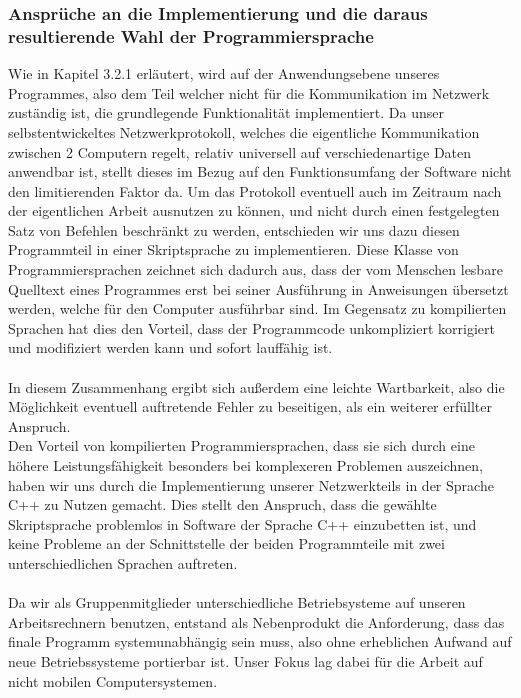 \subsubsection{Ansprüche an die Implementierung und die daraus resultierende Wahl der Programmiersprache}
Wie in Kapitel 3.2.1 %
 erläutert, wird auf der Anwendungsebene unseres Programmes, also dem Teil welcher nicht für die Kommunikation im Netzwerk zuständig ist, die grundlegende Funktionalität implementiert. Da unser selbstentwickeltes Netzwerkprotokoll, welches die eigentliche Kommunikation zwischen 2 Computern regelt, relativ universell auf verschiedenartige Daten anwendbar ist, stellt dieses im Bezug auf den Funktionsumfang der Software nicht den limitierenden Faktor da. Um das Protokoll eventuell auch im Zeitraum nach der eigentlichen Arbeit ausnutzen zu können, und nicht durch einen festgelegten Satz von Befehlen beschränkt zu werden, entschieden wir uns dazu diesen Programmteil in einer Skriptsprache zu implementieren.
Diese Klasse von Programmiersprachen zeichnet sich dadurch aus, dass der vom Menschen lesbare Quelltext eines Programmes erst bei seiner Ausführung in Anweisungen übersetzt werden, welche für den Computer ausführbar sind. Im Gegensatz zu kompilierten Sprachen hat dies den Vorteil, dass der Programmcode unkompliziert korrigiert und modifiziert werden kann und sofort lauffähig ist.\\\\
In diesem Zusammenhang ergibt sich außerdem eine leichte Wartbarkeit, also die Möglichkeit eventuell auftretende Fehler zu beseitigen, als ein weiterer erfüllter Anspruch.\\
Den Vorteil von kompilierten Programmiersprachen, dass sie sich durch eine höhere Leistungsfähigkeit besonders bei komplexeren Problemen auszeichnen, haben wir uns durch die Implementierung unserer Netzwerkteils in der Sprache C++ zu Nutzen gemacht. Dies stellt den Anspruch, dass die gewählte Skriptsprache problemlos in Software der Sprache C++ einzubetten ist, und keine Probleme an der Schnittstelle der beiden Programmteile mit zwei unterschiedlichen Sprachen auftreten.\\\\
Da wir als Gruppenmitglieder unterschiedliche Betriebsysteme auf unseren Arbeitsrechnern benutzen, entstand als Nebenprodukt die Anforderung, dass das finale Programm systemunabhängig sein muss, also ohne erheblichen Aufwand auf neue Betriebssysteme portierbar ist. 
Unser Fokus lag dabei für die Arbeit auf nicht mobilen Computersystemen.
